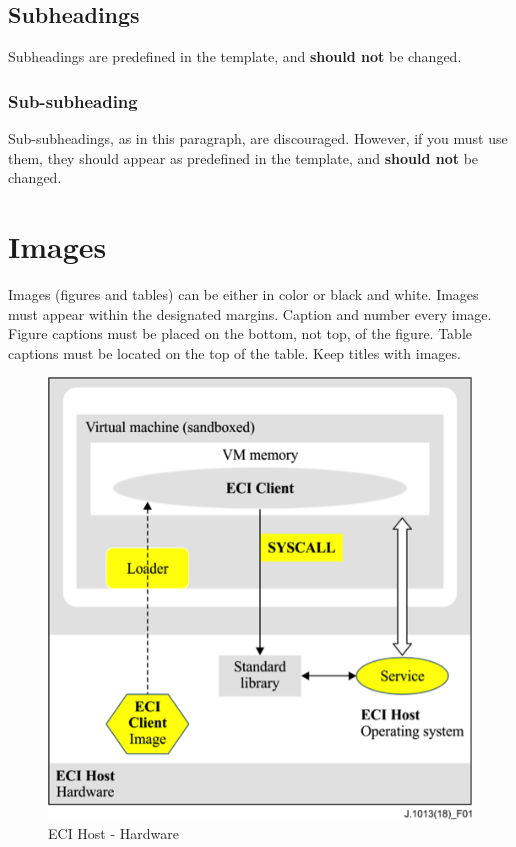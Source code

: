 \documentclass[10pt,a4paper,twocolumn]{article}
\def\startfigure{\vspace{6pt}\begin{figure}[ht]\center}
\begin{document}
\subsection{Subheadings}
\label{ssec:sec5.1}
Subheadings are predefined in the template, and \textbf{should not} be changed.

\subsubsection{Sub-subheading}
\label{sssec:sec5.1.1}
Sub-subheadings, as in this paragraph, are discouraged.
However, if you must use them, they should appear as predefined in the template, and \textbf{should not} be changed.


\section{Images}
\label{sec:sec6}
Images (figures and tables) can be either in color or black and white.
Images must appear within the designated margins.
Caption and number every image.
Figure captions must be placed on the bottom, not top, of the figure.
Table captions must be located on the top of the table.
Keep titles with images. 

\startfigure
\includegraphics[width=\columnwidth]{Figure1}
\caption{ECI Host - Hardware}\label{fig:fig1} 
\end{figure}
\end{document}
